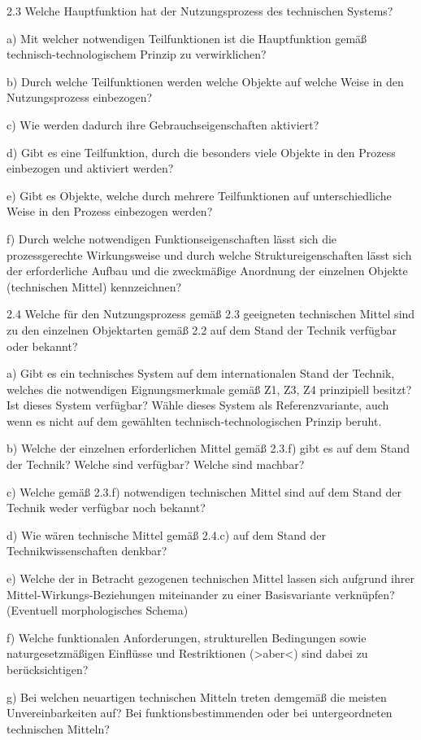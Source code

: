 \documentclass[12pt,a4paper]{article}
\begin{document}
2.3 Welche Hauptfunktion hat der Nutzungsprozess des technischen Systems?

a) Mit welcher notwendigen Teilfunktionen ist die Hauptfunktion gemäß
technisch-technologischem Prinzip zu verwirklichen?

b) Durch welche Teilfunktionen werden welche Objekte auf welche Weise in den
Nutzungsprozess einbezogen?

c) Wie werden dadurch ihre Gebrauchseigenschaften aktiviert?

d) Gibt es eine Teilfunktion, durch die besonders viele Objekte in den Prozess
einbezogen und aktiviert werden?

e) Gibt es Objekte, welche durch mehrere Teilfunktionen auf unterschiedliche
Weise in den Prozess einbezogen werden?

f) Durch welche notwendigen Funktionseigenschaften lässt sich die
prozessgerechte Wirkungsweise und durch welche Struktureigenschaften lässt sich
der erforderliche Aufbau und die zweckmäßige Anordnung der einzelnen Objekte
(technischen Mittel) kennzeichnen?

2.4 Welche für den Nutzungsprozess gemäß 2.3 geeigneten technischen Mittel sind
zu den einzelnen Objektarten gemäß 2.2 auf dem Stand der Technik verfügbar oder
bekannt?

a) Gibt es ein technisches System auf dem internationalen Stand der Technik,
welches die notwendigen Eignungsmerkmale gemäß Z1, Z3, Z4 prinzipiell besitzt?
Ist dieses System verfügbar? Wähle dieses System als Referenzvariante, auch
wenn es nicht auf dem gewählten technisch-technologischen Prinzip beruht.

b) Welche der einzelnen erforderlichen Mittel gemäß 2.3.f) gibt es auf dem
Stand der Technik? Welche sind verfügbar? Welche sind machbar?

c) Welche gemäß 2.3.f) notwendigen technischen Mittel sind auf dem Stand der
Technik weder verfügbar noch bekannt?

d) Wie wären technische Mittel gemäß 2.4.c) auf dem Stand der
Technikwissenschaften denkbar?

e) Welche der in Betracht gezogenen technischen Mittel lassen sich aufgrund
ihrer Mittel-Wirkungs-Beziehungen miteinander zu einer Basisvariante
verknüpfen? (Eventuell morphologisches Schema)

f) Welche funktionalen Anforderungen, strukturellen Bedingungen sowie
naturgesetzmäßigen Einflüsse und Restriktionen (>aber<) sind dabei zu
berücksichtigen?
	
g) Bei welchen neuartigen technischen Mitteln treten demgemäß die meisten
Unvereinbarkeiten auf? Bei funktionsbestimmenden oder bei untergeordneten
technischen Mitteln?
\end{document}
